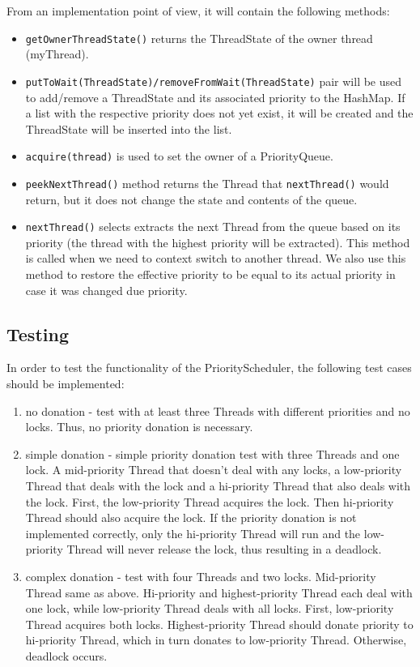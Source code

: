 \documentclass[a4paper,10pt]{article}
\begin{document}
From an implementation point of view, it will contain the following methods:
\begin{itemize}
\item \texttt{getOwnerThreadState()} returns the ThreadState of the owner thread (myThread).
\item \texttt{putToWait(ThreadState)/removeFromWait(ThreadState)} pair will be used to add/remove a ThreadState and its associated priority to the HashMap. If a list with the respective priority does not yet exist, it will be created and the ThreadState will be inserted into the list. 
\item \texttt{acquire(thread)} is used to set the owner of a PriorityQueue.
\item \texttt{peekNextThread()} method returns the Thread that \texttt{nextThread()} would return, but it does not change the state and contents of the queue.
\item \texttt{nextThread()} selects extracts the next Thread from the queue based on its priority (the thread with the highest priority will be extracted). This method is called when we need to context switch to another thread. We also use this method to restore the effective priority to be equal to its actual priority in case it was changed due priority.
\end{itemize}

\subsection{Testing}

In order to test the functionality of the PriorityScheduler, the following test cases should be implemented:
\begin{enumerate}
\item no donation - test with at least three Threads with different priorities and no locks. Thus, no priority donation is necessary.
\item simple donation - simple priority donation test with three Threads and one lock. A mid-priority Thread that doesn't deal with any locks, a low-priority Thread that deals with the lock and a hi-priority Thread that also deals with the lock. First, the low-priority Thread acquires the lock. Then hi-priority Thread should also acquire the lock. If the priority donation is not implemented correctly, only the hi-priority Thread will run and the low-priority Thread will never release the lock, thus resulting in a deadlock.
\item complex donation - test with four Threads and two locks. Mid-priority Thread same as above. Hi-priority and highest-priority Thread each deal with one lock, while low-priority Thread deals with all locks. First, low-priority Thread acquires both locks. Highest-priority Thread should donate priority to hi-priority Thread, which in turn donates to low-priority Thread. Otherwise, deadlock occurs.
\end{enumerate}
\end{document}
